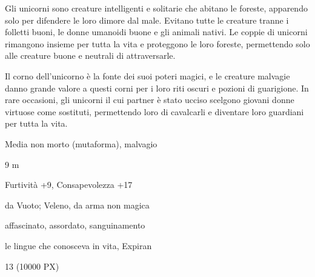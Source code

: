 \begin{multicols}{2}
{Gli unicorni sono creature intelligenti e solitarie che abitano le foreste, apparendo solo per difendere le loro dimore dal male. Evitano tutte le creature tranne i folletti buoni, le donne umanoidi buone e gli animali nativi. Le coppie di unicorni rimangono insieme per tutta la vita e proteggono le loro foreste, permettendo solo alle creature buone e neutrali di attraversarle.

Il corno dell'unicorno è la fonte dei suoi poteri magici, e le creature malvagie danno grande valore a questi corni per i loro riti oscuri e pozioni di guarigione. In rare occasioni, gli unicorni il cui partner è stato ucciso scelgono giovani donne virtuose come sostituti, permettendo loro di cavalcarli e diventare loro guardiani per tutta la vita.



\begin{description}[noitemsep, topsep=0pt, parsep=0pt, partopsep=0pt, itemsep=1pt, leftmargin=2.35cm,  labelwidth=2.2cm, itemindent=0cm, listparindent=0pt] %
\setlength{\baselineskip}{10pt}
\item[\textbf{Taglia/Tipo}] Media non morto (mutaforma), malvagio
\item[\textbf{Caratt.}] 
\item[\textbf{Punti Ferita}] 
\item[\textbf{Movimento}] 9 m
\item[\textbf{Tiri Salvez.}] 
\item[\textbf{Comp.}] Furtività +9, Consapevolezza +17
\item[\textbf{Imm. Danni}] da Vuoto; Veleno, da arma non magica
\item[\textbf{Immunità}] affascinato, assordato, sanguinamento
\item[\textbf{Sensi}] 
\item[\textbf{Linguaggi}] le lingue che conosceva in vita, Expiran
\item[\textbf{Sfida}] 13 (10000 PX)
\end{description}
\smallskip

}
\end{multicols}
